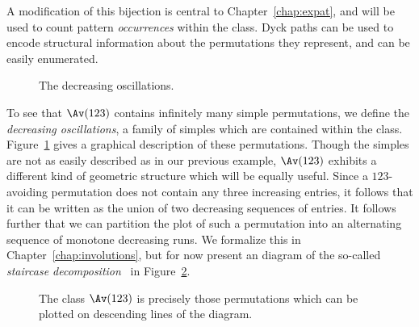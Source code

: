 \documentclass[12pt,twoside]{memoir}
\begin{document}
      A modification of this bijection is central to Chapter~\ref{chap:expat},
      and will be used to count pattern \emph{occurrences} within the class.
      Dyck paths can be used to encode structural information about the
      permutations they represent, and can be easily enumerated. 


      \begin{figure}[t] \centering
      \caption{The decreasing oscillations.}
      \label{prelim:fig:oscillation}
      \end{figure}

      To see that $\Av (123)$ contains infinitely many simple permutations, we
      define the \emph{decreasing oscillations}, a family of simples which are
      contained within the class. Figure~\ref{prelim:fig:oscillation} gives a
      graphical description of these permutations. 
      Though the simples are not as easily described as in our previous example,
      $\Av(123)$ exhibits a different kind of geometric structure which will be
      equally useful. Since a $123$-avoiding permutation does not contain any
      three increasing entries, it follows that it can be written as the union of
      two decreasing sequences of entries. It follows further that we can
      partition the plot of such a permutation into an alternating sequence of
      monotone decreasing runs. We formalize this in
      Chapter~\ref{chap:involutions}, but for now present an diagram of the
      so-called \emph{staircase decomposition}~\cite{Albert2010, me-involutions}
      in Figure~\ref{prelim:fig:staircase}.


      \begin{figure}[t] \centering
      \caption{The class $\Av(123)$ is precisely those permutations which can be
               plotted on descending lines of the diagram.}
      \label{prelim:fig:staircase}
      \end{figure}
\end{document}
